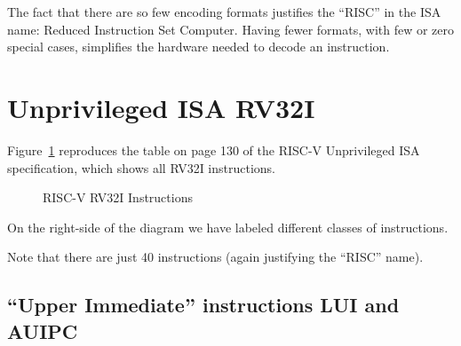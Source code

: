 The fact that there are so few encoding formats justifies the ``RISC''
in the ISA name: Reduced Instruction Set Computer.  Having fewer
formats, with few or zero special cases, simplifies the hardware
needed to decode an instruction.


\section{Unprivileged ISA RV32I}

\label{Sec_RV32I}


Figure~\ref{Fig_RV32I_labeled} reproduces the table on page 130 of the
RISC-V Unprivileged ISA specification, which shows all RV32I
instructions.
\begin{figure}[htbp]
  \centerline{}
  \caption{\label{Fig_RV32I_labeled} RISC-V RV32I Instructions}
\end{figure}
On the right-side of the diagram we have labeled different classes of
instructions.

Note that there are just 40 instructions (again justifying the ``RISC'' name).


\subsection{``Upper Immediate'' instructions LUI and AUIPC}

